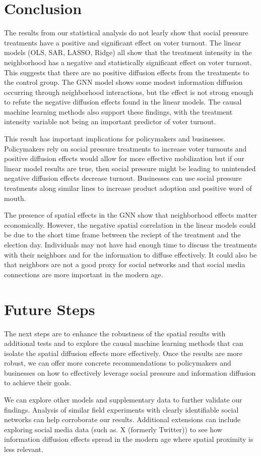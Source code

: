 \documentclass[11pt]{article}
\begin{document}
\section{Conclusion}
The results from our statistical analysis do not learly show that social pressure treatments have a positive and significant effect on voter turnout. The linear models (OLS, SAR, LASSO, Ridge) all show that the treatment intensity in the neighborhood has a negative and statistically significant effect on voter turnout. This suggests that there are no positive diffusion effects from the treatments to the control group. The GNN model shows some modest information diffusion occurring through neighborhood interactions, but the effect is not strong enough to refute the negative diffusion effects found in the linear models. The causal machine learning methods also support these findings, with the treatment intensity variable not being an important predictor of voter turnout.

This result has important implications for policymakers and businesses. Policymakers rely on social pressure treatments to increase voter turnouts and positive diffusion effects would allow for more effective mobilization but if our linear model results are true, then social pressure might be leading to unintended negative diffusion effects decrease turnout. Businesses can use social pressure treatments along similar lines to increase product adoption and positive word of mouth. 

The presence of spatial effects in the GNN show that neighborhood effects matter economically. However, the negative spatial correlation in the linear models could be due to the short time frame between the reciept of the treatment and the election day. Individuals may not have had enough time to discuss the treatments with their neighbors and for the information to diffuse effectively. It could also be that neighbors are not a good proxy for social networks and that social media connections are more important in the modern age.

\section{Future Steps}
The next steps are to enhance the robustness of the spatial results with additional tests and to explore the causal machine learning methods that can isolate the spatial diffusion effects more effectively. Once the results are more robust, we can offer more concrete recommendations to policymakers and businesses on how to effectively leverage social pressure and information diffusion to achieve their goals.

We can explore other models and supplementary data to further validate our findings. Analysis of similar field experiments with clearly identifiable social networks can help corroborate our results. Additional extensions can include exploring social media data (such as. X (formerly Twitter)) to see how information diffusion effects spread in the modern age where spatial proximity is less relevant.


\end{document}

